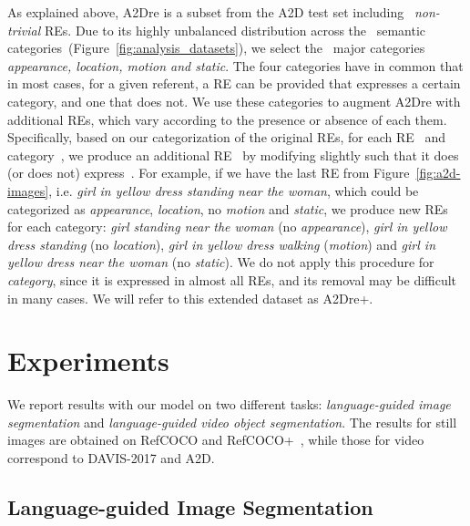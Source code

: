 \documentclass[10pt,twocolumn,letterpaper]{article}
\begin{document}
As explained above, A2Dre is a subset from the A2D test set including ~\textit{non-trivial} REs. 
Due to its highly unbalanced distribution across the ~semantic categories~(Figure~\ref{fig:analysis_datasets}), we select the ~major categories \textsl{appearance, location, motion and static}. 
The four categories have in common that in most cases, for a given referent, a RE can be provided that expresses a certain category, and one that does not. 
We use these categories to augment A2Dre with additional REs, which vary according to the presence or absence of each them. Specifically, based on our categorization of the original REs, for each RE~ and category~, we produce an additional RE~ by modifying  slightly such that it does (or does not) express~. 
For example, if we have the last RE from Figure~\ref{fig:a2d-images}, i.e. \emph{girl in yellow dress standing near the woman}, which could be categorized as \textit{appearance}, \textit{location}, no \textit{motion} and \textit{static}, we produce new REs for each category: \emph{girl standing near the woman} (no \textit{appearance}), \emph{girl in yellow dress standing} (no \textit{location}), \emph{girl in yellow dress walking} (\textit{motion}) and \emph{girl in yellow dress near the woman} (no \textit{static}). 
We do not apply this procedure for \textsl{category}, since it is expressed in almost all REs, and its removal may be difficult in many cases. 
We will refer to this extended dataset as A2Dre+.






















 \section{Experiments}
\label{sec:experiments}

We report results with our model on two different tasks: \textit{language-guided image segmentation} and \textit{language-guided video object segmentation}. The results for still images are obtained on RefCOCO and RefCOCO+~\cite{yu2016modeling}, while those for video correspond to DAVIS-2017 and A2D. 



\subsection{Language-guided Image Segmentation}
\label{ssec:ExperimentsImage}
\end{document}
